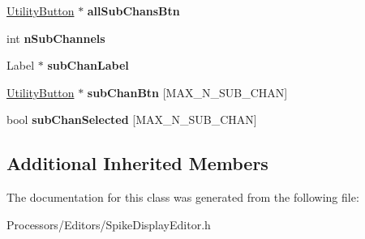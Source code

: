 \begin{DoxyCompactItemize}
\item 
\hypertarget{classSpikeDisplayEditor_aaf44191f75ab94175249b6e844c63bce}{\hyperlink{classUtilityButton}{Utility\-Button} $\ast$ {\bfseries all\-Sub\-Chans\-Btn}}\label{classSpikeDisplayEditor_aaf44191f75ab94175249b6e844c63bce}

\item 
\hypertarget{classSpikeDisplayEditor_a5c008c4e2d3b39d96046f1e9c0784802}{int {\bfseries n\-Sub\-Channels}}\label{classSpikeDisplayEditor_a5c008c4e2d3b39d96046f1e9c0784802}

\item 
\hypertarget{classSpikeDisplayEditor_a3291774d897476b171ebbfcd76101520}{Label $\ast$ {\bfseries sub\-Chan\-Label}}\label{classSpikeDisplayEditor_a3291774d897476b171ebbfcd76101520}

\item 
\hypertarget{classSpikeDisplayEditor_af49e74e3dec861024f2c501218c5d1c9}{\hyperlink{classUtilityButton}{Utility\-Button} $\ast$ {\bfseries sub\-Chan\-Btn} \mbox{[}M\-A\-X\-\_\-\-N\-\_\-\-S\-U\-B\-\_\-\-C\-H\-A\-N\mbox{]}}\label{classSpikeDisplayEditor_af49e74e3dec861024f2c501218c5d1c9}

\item 
\hypertarget{classSpikeDisplayEditor_ae7e6e3e7c3a263144f1981cb6bd090db}{bool {\bfseries sub\-Chan\-Selected} \mbox{[}M\-A\-X\-\_\-\-N\-\_\-\-S\-U\-B\-\_\-\-C\-H\-A\-N\mbox{]}}\label{classSpikeDisplayEditor_ae7e6e3e7c3a263144f1981cb6bd090db}

\end{DoxyCompactItemize}
\subsection*{Additional Inherited Members}


The documentation for this class was generated from the following file\-:\begin{DoxyCompactItemize}
\item 
Processors/\-Editors/Spike\-Display\-Editor.\-h\end{DoxyCompactItemize}

